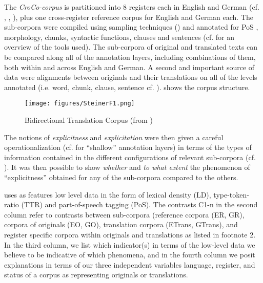 \documentclass[output=paper]{LSP/langsci}
\begin{document}
The \textit{CroCo-corpus} is partitioned into 8 registers each in English and German (cf. \citealt{Hansen-SchirraEtAl2007}, \citealt{VelaEtAl2007}, \citealt{Steiner2008}), plus one cross-register reference corpus for English and German each. The sub-corpora were compiled using sampling techniques (\citealt{Biber1998}) and annotated for PoS , morphology, chunks, syntactic functions, clauses and sentences (cf. \citealt{ČuloEtAl2008} for an overview of the tools used). The sub-corpora of original and translated texts can be compared along all of the annotation layers, including combinations of them, both within and across English and German. A second and important source of data were alignments between originals and their translations on all of the levels annotated (i.e. word, chunk, clause, sentence cf. \citealt{ČuloEtAl2011}).  shows the corpus structure.


\begin{figure}
\texttt{[image: figures/SteinerF1.png]}
\caption{Bidirectional Translation Corpus (from \citealt[ch.2]{Hansen-SchirraEtAlfc})}
\label{fig:steiner:BidirectionalTranslationCorpus}
\end{figure} 

The notions of \textit{explicitness }and\textit{ explicitation} were then given a careful operationalization (cf.  for ``shallow'' annotation layers) in terms of the types of information contained in the different configurations of relevant sub-corpora (cf. ). It was then possible to show \textit{whether} and \textit{to what extent} the phenomenon of ``explicitness'' obtained for any of the sub-corpora compared to the others. 

 uses as features low level data in the form of lexical density (LD), type-token-ratio (TTR) and part-of-speech tagging (PoS). The contrasts C1-n in the second column refer to contrasts between sub-corpora (reference corpora (ER, GR), corpora of originals (EO, GO), translation corpora (ETrans, GTrans), and register specific corpora within originals and translations as listed in footnote 2. In the third column, we list which indicator(s) in terms of the low-level data we believe to be indicative of which phenomena, and in the fourth column we posit explanations in terms of our three independent variables language, register, and status of a corpus as representing originals or translations. 
\end{document}

